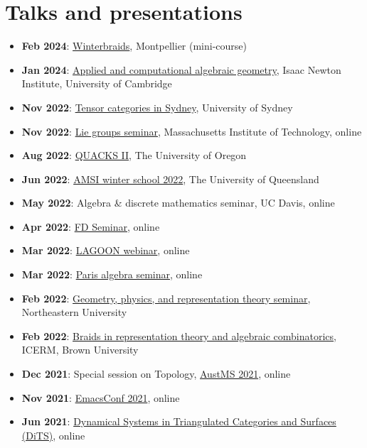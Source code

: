 \documentclass[a4paper]{moderncv}
\begin{document}
\section{Talks and presentations}
\label{sec:orgdeb48c4}
\begin{itemize}
\item \textbf{Feb 2024}: \href{https://winterbraids-xiii.sciencesconf.org/}{Winterbraids}, Montpellier (mini-course)
\item \textbf{Jan 2024}: \href{https://www.newton.ac.uk/event/emgw02/}{Applied and computational algebraic geometry}, Isaac Newton Institute, University of Cambridge
\item \textbf{Nov 2022}: \href{https://www.maths.usyd.edu.au/u/kevinc/TensorCat.html}{Tensor categories in Sydney}, University of Sydney
\item \textbf{Nov 2022}: \href{https://math.mit.edu/lg/}{Lie groups seminar}, Massachusetts Institute of Technology, online
\item \textbf{Aug 2022}: \href{https://pages.uoregon.edu/belias/QUACKSII/index.html}{QUACKS II}, The University of Oregon
\item \textbf{Jun 2022}: \href{https://ws.amsi.org.au/}{AMSI winter school 2022}, The University of Queensland
\item \textbf{May 2022}: Algebra \& discrete mathematics seminar, UC Davis, online
\item \textbf{Apr 2022}: \href{https://www.fd-seminar.xyz/}{FD Seminar}, online
\item \textbf{Mar 2022}: \href{https://sites.google.com/view/lagoonwebinar/home}{LAGOON webinar}, online
\item \textbf{Mar 2022}: \href{https://www.imj-prg.fr/gestion/evenement/affEvenement/1}{Paris algebra seminar}, online
\item \textbf{Feb 2022}: \href{http://mathserver.neu.edu/\~robin/Seminars/GPRT/index.html}{Geometry, physics, and representation theory seminar}, Northeastern University
\item \textbf{Feb 2022}: \href{https://icerm.brown.edu/programs/sp-s22/w1/}{Braids in representation theory and algebraic combinatorics}, ICERM, Brown University
\item \textbf{Dec 2021}: Special session on Topology, \href{https://austms.org.au/event/austms-2021/}{AustMS 2021}, online
\item \textbf{Nov 2021}: \href{https://emacsconf.org/2021/}{EmacsConf 2021}, online
\item \textbf{Jun 2021}: \href{https://sites.google.com/view/symposium-dits/}{Dynamical Systems in Triangulated Categories and Surfaces (DiTS)}, online

\end{itemize}
\end{document}
